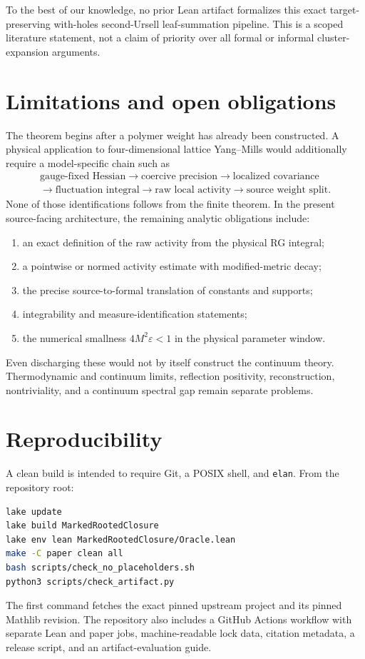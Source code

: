 \documentclass[11pt]{article}
\begin{document}
To the best of our knowledge, no prior Lean artifact formalizes this exact target-preserving with-holes second-Ursell leaf-summation pipeline.  This is a scoped literature statement, not a claim of priority over all formal or informal cluster-expansion arguments.

\section{Limitations and open obligations}

The theorem begins after a polymer weight has already been constructed.  A physical application to four-dimensional lattice Yang--Mills would additionally require a model-specific chain such as
\[
\begin{gathered}
\text{gauge-fixed Hessian}\to\text{coercive precision}\to\text{localized covariance}\\
\to\text{fluctuation integral}\to\text{raw local activity}\to\text{source weight split}.
\end{gathered}
\]
None of those identifications follows from the finite theorem.  In the present source-facing architecture, the remaining analytic obligations include:
\begin{enumerate}[leftmargin=2.5em]
  \item an exact definition of the raw activity from the physical RG integral;
  \item a pointwise or normed activity estimate with modified-metric decay;
  \item the precise source-to-formal translation of constants and supports;
  \item integrability and measure-identification statements;
  \item the numerical smallness $4M^2\varepsilon<1$ in the physical parameter window.
\end{enumerate}
Even discharging these would not by itself construct the continuum theory.  Thermodynamic and continuum limits, reflection positivity, reconstruction, nontriviality, and a continuum spectral gap remain separate problems.

\section{Reproducibility}

A clean build is intended to require Git, a POSIX shell, and \texttt{elan}.  From the repository root:
\begin{lstlisting}[language=bash]
lake update
lake build MarkedRootedClosure
lake env lean MarkedRootedClosure/Oracle.lean
make -C paper clean all
bash scripts/check_no_placeholders.sh
python3 scripts/check_artifact.py
\end{lstlisting}
The first command fetches the exact pinned upstream project and its pinned Mathlib revision.  The repository also includes a GitHub Actions workflow with separate Lean and paper jobs, machine-readable lock data, citation metadata, a release script, and an artifact-evaluation guide.
\end{document}
